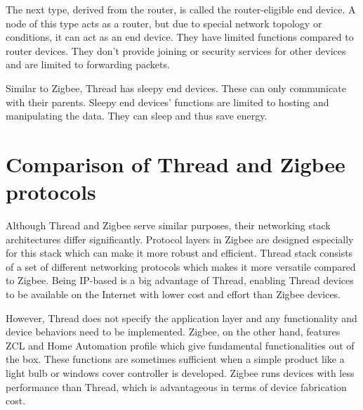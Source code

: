 The next type, derived from the router, is called the router-eligible end device. A node of this type acts as a router, but
due to special network topology or conditions, it can act as an end device. They have limited functions compared to
router devices. They don't provide joining or security services for other devices and are limited to forwarding
packets\cite{ThreadStackFundamentals}.

Similar to Zigbee, Thread has sleepy end devices. These can only communicate with their parents. Sleepy end devices' functions are limited to hosting and manipulating the data. They can sleep and thus save energy\cite{ThreadStackFundamentals}.

\section{Comparison of Thread and Zigbee protocols}

Although Thread and Zigbee serve similar purposes, their networking stack architectures
differ significantly. Protocol layers in Zigbee are designed especially for this stack
which can make it more robust and efficient.  Thread stack consists of a set of different networking protocols which makes
it more versatile compared to Zigbee. Being IP-based is a big advantage of Thread, 
enabling Thread devices to be available on the Internet with lower cost and effort
than Zigbee devices.

However, Thread does not specify the application layer and
any functionality and device behaviors need to be implemented. Zigbee, on the other hand, 
features ZCL and Home Automation profile which give fundamental functionalities out of the
box. These functions are sometimes sufficient when a simple product like
a light bulb or windows cover controller is developed. Zigbee runs devices with less 
performance than Thread, which is advantageous in terms of device fabrication cost. 
